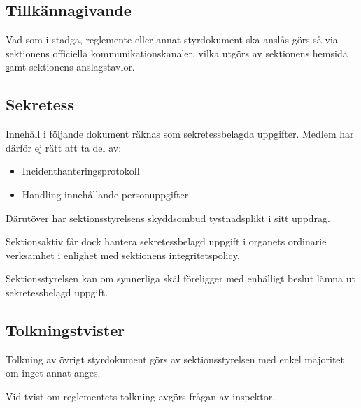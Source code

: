 \documentclass{styrdokument}
\begin{document}
\subsection{Tillkännagivande}
\? Vad som i stadga, reglemente eller annat styrdokument ska anslås görs så via sektionens officiella kommunikationskanaler, vilka utgörs av sektionens hemsida \href{ftek.se} samt sektionens anslagstavlor.

\subsection{Sekretess}
\? Innehåll i följande dokument räknas som sekretessbelagda uppgifter. Medlem har därför ej rätt att ta
del av:
\begin{itemize}
    \item Incidenthanteringsprotokoll
    \item Handling innehållande personuppgifter
\end{itemize}

\? Därutöver har sektionsstyrelsens skyddsombud tystnadsplikt i sitt uppdrag.

\? Sektionsaktiv får dock hantera sekretessbelagd uppgift i organets ordinarie verksamhet i enlighet med sektionens integritetspolicy.

\? Sektionsstyrelsen kan om synnerliga skäl föreligger med enhälligt beslut lämna ut sekretessbelagd uppgift.

\subsection{Tolkningstvister}
\? Tolkning av övrigt styrdokument görs av sektionsstyrelsen med enkel majoritet om inget annat anges.

\? Vid tvist om reglementets tolkning avgörs frågan av inspektor.

\end{document}
